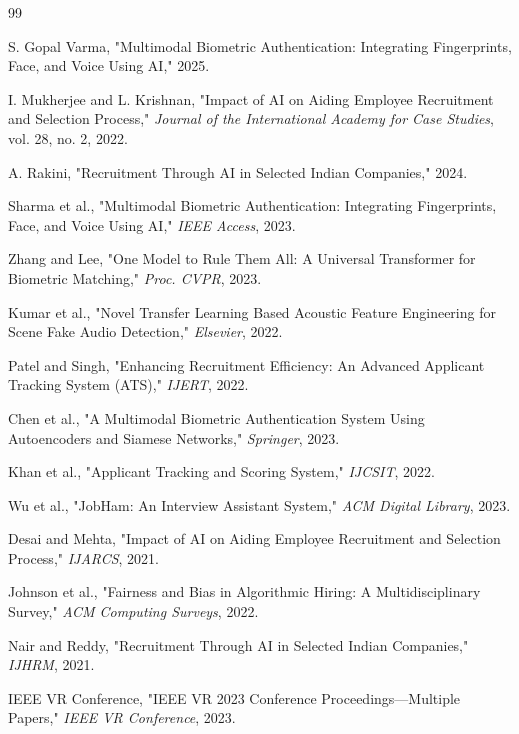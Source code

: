 \documentclass[conference]{IEEEtran}
\begin{document}
\begin{thebibliography}{99}

S. Gopal Varma, "Multimodal Biometric Authentication: Integrating Fingerprints, Face, and Voice Using AI," 2025.

I. Mukherjee and L. Krishnan, "Impact of AI on Aiding Employee Recruitment and Selection Process," \textit{Journal of the International Academy for Case Studies}, vol. 28, no. 2, 2022.

A. Rakini, "Recruitment Through AI in Selected Indian Companies," 2024.

Sharma et al., "Multimodal Biometric Authentication: Integrating Fingerprints, Face, and Voice Using AI," \textit{IEEE Access}, 2023.

Zhang and Lee, "One Model to Rule Them All: A Universal Transformer for Biometric Matching," \textit{Proc. CVPR}, 2023.

Kumar et al., "Novel Transfer Learning Based Acoustic Feature Engineering for Scene Fake Audio Detection," \textit{Elsevier}, 2022.

Patel and Singh, "Enhancing Recruitment Efficiency: An Advanced Applicant Tracking System (ATS)," \textit{IJERT}, 2022.

Chen et al., "A Multimodal Biometric Authentication System Using Autoencoders and Siamese Networks," \textit{Springer}, 2023.

Khan et al., "Applicant Tracking and Scoring System," \textit{IJCSIT}, 2022.

Wu et al., "JobHam: An Interview Assistant System," \textit{ACM Digital Library}, 2023.

Desai and Mehta, "Impact of AI on Aiding Employee Recruitment and Selection Process," \textit{IJARCS}, 2021.

Johnson et al., "Fairness and Bias in Algorithmic Hiring: A Multidisciplinary Survey," \textit{ACM Computing Surveys}, 2022.

Nair and Reddy, "Recruitment Through AI in Selected Indian Companies," \textit{IJHRM}, 2021.

IEEE VR Conference, "IEEE VR 2023 Conference Proceedings—Multiple Papers," \textit{IEEE VR Conference}, 2023.


\end{thebibliography}
\end{document}
